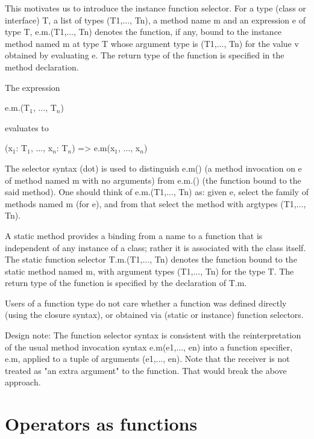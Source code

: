 This motivates us to introduce the instance function selector. For a
type (class or interface) T, a list of types (T1,..., Tn), a method name
m and an expression e of type T, e.m.(T1,..., Tn) denotes the function,
if any, bound to the instance method named m at type T whose argument
type is (T1,..., Tn) for the value v obtained by evaluating e. The
return type of the function is specified in the method declaration.

The expression

\begin{xtenmath}
e.m.(T$_1$, $\dots$, T$_n$)
\end{xtenmath}

evaluates to

\begin{xtenmath}
(x$_1$: T$_1$, $\dots$, x$_n$: T$_n$) => e.m(x$_1$, $\dots$, x$_n$)
\end{xtenmath}

\begin{note}
The selector syntax (dot) is used to distinguish e.m() (a
method invocation on e of method named m with no arguments) from e.m.()
(the function bound to the said method). One should think of
e.m.(T1,..., Tn) as: given e, select the family of methods named m (for
e), and from that select the method with argtypes (T1,..., Tn).
\end{note}

A static method provides a binding from a name to a function that is
independent of any instance of a class; rather it is associated with the
class itself. The static function selector T.m.(T1,..., Tn) denotes the
function bound to the static method named m, with argument types
(T1,..., Tn) for the type T. The return type of the function is
specified by the declaration of T.m.

Users of a function type do not care whether a function was defined
directly (using the closure syntax), or obtained via (static or
instance) function selectors.

\begin{note}
Design note: The function selector syntax is consistent with the
reinterpretation of the usual method invocation syntax e.m(e1,..., en)
into a function specifier, e.m, applied to a tuple of arguments (e1,...,
en). Note that the receiver is not treated as "an extra argument" to the
function. That would break the above approach.
\end{note}


\section{ Operators as functions}


